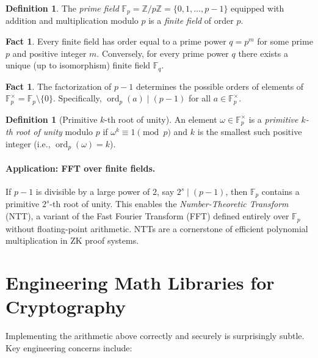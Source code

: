 \documentclass[11pt]{article}
\theoremstyle{plain}
\theoremstyle{definition}
\newtheorem{definition}[theorem]{Definition}
\newtheorem{fact}[theorem]{Fact}
\newcommand{\Z}{\mathbb{Z}}
\DeclareMathOperator{\ord}{ord}
\newcommand{\Fp}{\mathbb{F}_p}
\begin{document}
\begin{definition}
  The \emph{prime field} $\Fp = \Z/p\Z = \{0, 1, \ldots, p-1\}$
  equipped with addition and multiplication modulo $p$ is a
  \emph{finite field} of order $p$.
\end{definition}

\begin{fact}
  Every finite field has order equal to a prime power $q = p^m$ for
  some prime $p$ and positive integer $m$.  Conversely, for every
  prime power $q$ there exists a unique (up to isomorphism) finite
  field $\mathbb{F}_q$.
\end{fact}

\begin{fact}
  The factorization of $p - 1$ determines the possible orders of
  elements of $\Fp^{\times} = \Fp \setminus \{0\}$.  Specifically,
  $\ord_p(a) \mid (p-1)$ for all $a \in \Fp^{\times}$.
\end{fact}

\begin{definition}[Primitive $k$-th root of unity]
  An element $\omega \in \Fp^{\times}$ is a \emph{primitive $k$-th
  root of unity} modulo $p$ if $\omega^k \equiv 1 \pmod{p}$ and $k$
  is the smallest such positive integer (i.e., $\ord_p(\omega) = k$).
\end{definition}

\paragraph{Application: FFT over finite fields.}
If $p - 1$ is divisible by a large power of $2$, say $2^s \mid (p-1)$,
then $\Fp$ contains a primitive $2^s$-th root of unity.  This enables
the \emph{Number-Theoretic Transform} (NTT), a variant of the Fast
Fourier Transform (FFT) defined entirely over $\Fp$ without floating-point
arithmetic.  NTTs are a cornerstone of efficient polynomial multiplication
in ZK proof systems.

\section{Engineering Math Libraries for Cryptography}

Implementing the arithmetic above correctly and securely is surprisingly
subtle.  Key engineering concerns include:
\end{document}

